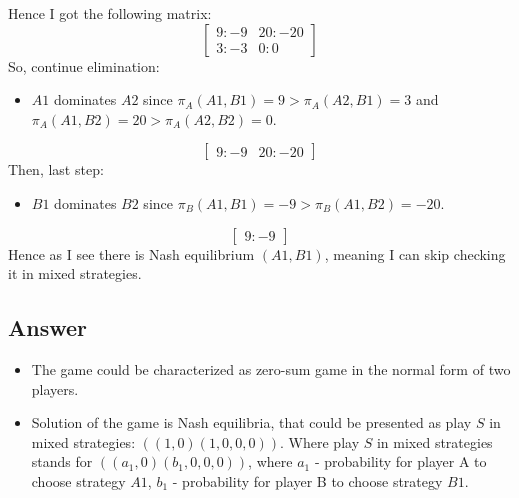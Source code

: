 \documentclass[
	a4paper, %
	11pt, %
]{CSUniSchoolLabReport}
\begin{document}
Hence I got the following matrix:
$$
\begin{bmatrix}
    9:-9 & 20:-20 \\
    3:-3 & 0:0
\end{bmatrix}
$$
So, continue elimination:
\begin{itemize}
    \item $A1$ dominates $A2$ since $\pi_A(A1, B1) = 9 > \pi_A(A2, B1) = 3$ and $\pi_A(A1, B2) = 20 > \pi_A(A2, B2) = 0$.
\end{itemize}
$$
\begin{bmatrix}
    9:-9 & 20:-20
\end{bmatrix}
$$
Then, last step:
\begin{itemize}
    \item $B1$ dominates $B2$ since $\pi_B(A1, B1) = -9 > \pi_B(A1, B2) = -20$.
\end{itemize}
$$
\begin{bmatrix}
    9:-9
\end{bmatrix}
$$
Hence as I see there is Nash equilibrium $(A1,B1)$, meaning I can skip checking it in mixed strategies.

\subsection{Answer}\label{answer01}
\begin{itemize}
    \item The game could be characterized as zero-sum game in the normal form of two players.
    \item Solution of the game is Nash equilibria, that could be presented as play $S$ in mixed strategies: $((1, 0)(1, 0, 0, 0))$. Where play $S$ in mixed strategies stands for $((a_1, 0)(b_1, 0, 0, 0))$, where $a_1$ - probability for player A to choose strategy $A1$, $b_1$ - probability for player B to choose strategy $B1$.
\end{itemize}
\end{document}
